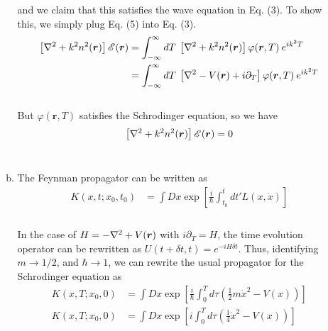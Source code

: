 \documentclass[]{article}
\begin{document}
\begin{enumerate}[1)]
\begin{enumerate}[a)]
and we claim that this satisfies the wave equation in Eq. (3). To show this, we simply plug Eq. (5) into Eq. (3). \\

\begin{equation}
\begin{aligned}
\left[  \laplacian +  k^2 n^2(\bm{r} )   \right] \mathscr{E}( \bm{r}) & =  \int_{-\infty}^{\infty} dT \: \left[  \laplacian +  k^2 n^2(\bm{r} )   \right]   \varphi ( \bm{r} , T) \: e^{  i k^2 T } \\ 
& =  \int_{-\infty}^{\infty} dT \: \left[  \laplacian - V( \bm{r} )  + i \partial_T \right]   \varphi ( \bm{r} , T) \: e^{  i k^2 T } \\ 
\end{aligned}
\end{equation} \\

But $\varphi ( \bm{r} , T)$ satisfies the Schrodinger equation, so we have \\


\begin{equation}
\begin{aligned}
\left[  \laplacian +  k^2 n^2(\bm{r} )   \right] \mathscr{E}( \bm{r}) & =  0 \\
\end{aligned}
\end{equation} \\


\item The Feynman propagator can be written as \\

\begin{equation}
\begin{aligned}
K( x, t ; x_0 , t_0 ) & = \int Dx \exp\left[ \frac{ i }{ \hbar } \int_{t_0}^{t} dt' L( x, \dot{x} ) \right] \\
\end{aligned}
\end{equation} \\

In the case of $H = - \laplacian + V( \bm{r} ) $ with $ i \partial_T = H$, the time evolution operator can be rewritten as $U(t+\delta t , t ) = e^{ - i H \delta t} $. Thus, identifying $m \to 1/2$, and $\hbar \to 1$, we can rewrite the usual propagator for the Schrodinger equation as \\

\begin{equation}
\begin{aligned}
K( x, T ; x_0 , 0 ) & = \int Dx \exp\left[ \frac{ i }{ \hbar } \int_{0}^{T} d\tau \left( \frac{1}{2} m \dot{x}^2  - V(x)   \right) \right] \\
%
K( x, T ; x_0 , 0 ) & = \int Dx \exp\left[ i \int_{0}^{T} d\tau \left( \frac{1}{4}  \dot{x}^2  - V(x)   \right) \right] \\
%
\end{aligned}
\end{equation} \\




\end{enumerate}
\end{enumerate}
\end{document}
